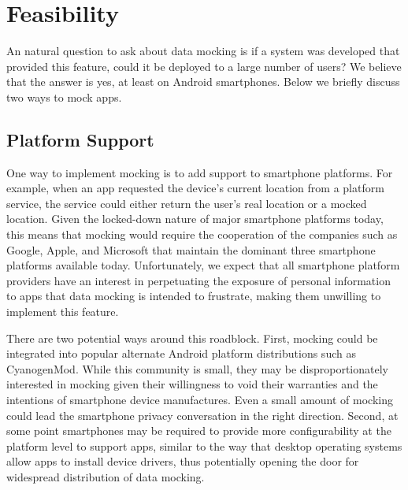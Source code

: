 \section{Feasibility}
\label{sec-feasibility}

An natural question to ask about data mocking is if a system was developed
that provided this feature, could it be deployed to a large number of users?
We believe that the answer is yes, at least on Android smartphones. Below we
briefly discuss two ways to mock apps.

\subsection{Platform Support}

One way to implement mocking is to add support to smartphone platforms. For
example, when an app requested the device's current location from a platform
service, the service could either return the user's real location or a mocked
location. Given the locked-down nature of major smartphone platforms today,
this means that mocking would require the cooperation of the companies such
as Google, Apple, and Microsoft that maintain the dominant three smartphone
platforms available today. Unfortunately, we expect that all smartphone
platform providers have an interest in perpetuating the exposure of personal
information to apps that data mocking is intended to frustrate, making them
unwilling to implement this feature.


There are two potential ways around this roadblock. First, mocking could be
integrated into popular alternate Android platform distributions such as
CyanogenMod. While this community is small, they may be disproportionately
interested in mocking given their willingness to void their warranties and
the intentions of smartphone device manufactures. Even a small amount of
mocking could lead the smartphone privacy conversation in the right
direction. Second, at some point smartphones may be required to provide more
configurability at the platform level to support apps, similar to the way
that desktop operating systems allow apps to install device drivers, thus
potentially opening the door for widespread distribution of data mocking.

